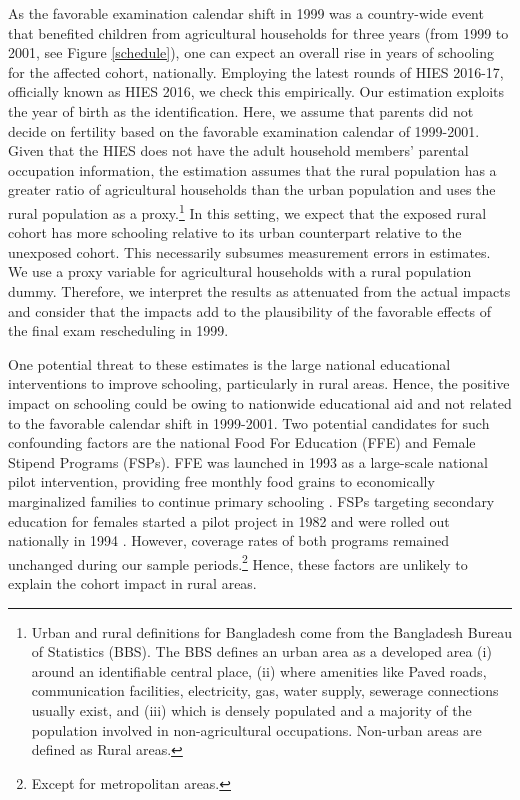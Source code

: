 \documentclass[12pt,letterpaper]{article}
\newcommand{\0}{\ensuremath{\mbox{\boldmath $0$}}}
\begin{document}
As the favorable examination calendar shift in 1999 was a country-wide event that benefited children from agricultural households for three years (from 1999 to 2001, see Figure \ref{schedule}), one can expect an overall rise in years of schooling for the affected cohort, nationally. Employing the latest rounds of HIES 2016-17, officially known as HIES 2016, we check this empirically. Our estimation exploits the year of birth as the identification. Here, we assume that parents did not decide on fertility based on the favorable examination calendar of 1999-2001. Given that the HIES does not have the adult household members' parental occupation information, the estimation assumes that the rural population has a greater ratio of agricultural households than the urban population and uses the rural population as a proxy.\footnote{Urban and rural definitions for Bangladesh come from the Bangladesh Bureau of Statistics (BBS). The BBS defines an urban area as a developed area (i) around an identifiable central place, (ii) where amenities like Paved roads, communication facilities, electricity, gas, water supply, sewerage connections usually exist, and (iii) which is densely populated and a majority of the population involved in non-agricultural occupations. Non-urban areas are defined as Rural areas.} In this setting, we expect that the exposed rural cohort has more schooling relative to its urban counterpart relative to the unexposed cohort. This necessarily subsumes measurement errors in estimates. We use a proxy variable for agricultural households with a rural population dummy. Therefore, we interpret the results as attenuated from the actual impacts and consider that the impacts add to the plausibility of the favorable effects of the final exam rescheduling in 1999.

One potential threat to these estimates is the large national educational interventions to improve schooling, particularly in rural areas. Hence, the positive impact on schooling could be owing to nationwide educational aid and not related to the favorable calendar shift in 1999-2001. Two potential candidates for such confounding factors are the national Food For Education (FFE) and Female Stipend Programs (FSPs). FFE was launched in 1993 as a large-scale national pilot intervention, providing free monthly food grains to economically marginalized families to continue primary schooling  \citep{ahmed2002food}. FSPs targeting secondary education for females started a pilot project in 1982 and were rolled out nationally in 1994  \citep{xu2022assessing}. However, coverage rates of both programs remained unchanged during our sample periods.\footnote{Except for metropolitan areas. } Hence, these factors are unlikely to explain the cohort impact in rural areas. 
\end{document}
